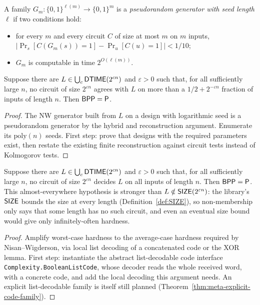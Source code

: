 \begin{definition}
  \label{def:frontiers-prg}
  A family $G_m : \{0,1\}^{\ell(m)} \to \{0,1\}^m$ is a \emph{pseudorandom
  generator with seed length $\ell$} if two conditions hold:
  \begin{itemize}
    \item for every $m$ and every circuit $C$ of size at most $m$ on $m$ inputs,
      $\lvert \Pr_s[C(G_m(s)) = 1] - \Pr_u[C(u) = 1] \rvert < 1/10$;
    \item $G_m$ is computable in time $2^{O(\ell(m))}$.
  \end{itemize}
\end{definition}

\begin{theorem}
  \label{thm:frontiers-nw}
  Suppose there are $L \in \bigcup_c \mathsf{DTIME}(2^{cn})$ and $\varepsilon > 0$
  such that, for all sufficiently large $n$, no circuit of size $2^{\varepsilon n}$
  agrees with $L$ on more than a $1/2 + 2^{-\varepsilon n}$ fraction of inputs of
  length $n$. Then $\mathsf{BPP} = \mathsf{P}$.
\end{theorem}
\begin{proof}
  The NW generator built from $L$ on a design with logarithmic seed is a
  pseudorandom generator by the hybrid and reconstruction argument. Enumerate its
  $\mathrm{poly}(n)$ seeds. First step: prove that designs with the required
  parameters exist, then restate the existing finite reconstruction against
  circuit tests instead of Kolmogorov tests.
\end{proof}

\begin{theorem}
  \label{thm:frontiers-iw}
  Suppose there are $L \in \bigcup_c \mathsf{DTIME}(2^{cn})$ and $\varepsilon > 0$
  such that, for all sufficiently large $n$, no circuit of size $2^{\varepsilon n}$
  decides $L$ on all inputs of length $n$. Then $\mathsf{BPP} = \mathsf{P}$. This
  almost-everywhere hypothesis is stronger than
  $L \notin \mathsf{SIZE}(2^{\varepsilon n})$: the library's $\mathsf{SIZE}$ bounds the
  size at every length (Definition~\ref{def:SIZE}), so non-membership only
  says that some length has no such circuit, and even an eventual size bound
  would give only infinitely-often hardness.
\end{theorem}
\begin{proof}
  Amplify worst-case hardness to the average-case hardness required by
  Nisan--Wigderson, via local list decoding of a concatenated code or the XOR
  lemma. First step: instantiate the abstract list-decodable code interface
  \texttt{Complexity.BooleanListCode}, whose decoder reads the whole received
  word, with a concrete code, and add the local decoding this argument needs.
  An explicit list-decodable family is itself still planned
  (Theorem~\ref{thm:meta-explicit-code-family}).
\end{proof}

